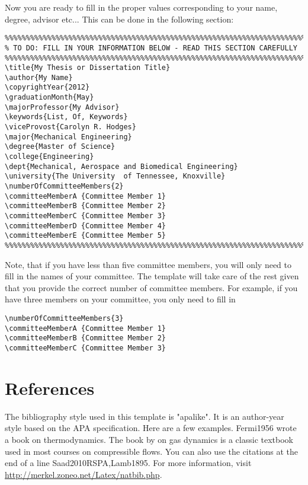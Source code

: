 Now you are ready to fill in the proper values corresponding to your name, degree, advisor etc... This can be done in the following section:
\begin{verbatim}
%%%%%%%%%%%%%%%%%%%%%%%%%%%%%%%%%%%%%%%%%%%%%%%%%%%%%%%%%%%%%%%%%%%%%%%%%%%
% TO DO: FILL IN YOUR INFORMATION BELOW - READ THIS SECTION CAREFULLY
%%%%%%%%%%%%%%%%%%%%%%%%%%%%%%%%%%%%%%%%%%%%%%%%%%%%%%%%%%%%%%%%%%%%%%%%%%%
\title{My Thesis or Dissertation Title}
\author{My Name}
\copyrightYear{2012}
\graduationMonth{May}
\majorProfessor{My Advisor}
\keywords{List, Of, Keywords}
\viceProvost{Carolyn R. Hodges}
\major{Mechanical Engineering}
\degree{Master of Science}
\college{Engineering}
\dept{Mechanical, Aerospace and Biomedical Engineering}
\university{The University  of Tennessee, Knoxville}
\numberOfCommitteeMembers{2}
\committeeMemberA {Committee Member 1}
\committeeMemberB {Committee Member 2}
\committeeMemberC {Committee Member 3}
\committeeMemberD {Committee Member 4}
\committeeMemberE {Committee Member 5}
%%%%%%%%%%%%%%%%%%%%%%%%%%%%%%%%%%%%%%%%%%%%%%%%%%%%%%%%%%%%%%%%%%%%%%%%%%%
\end{verbatim}
Note, that if you have less than five committee members, you will only need to fill in the names of your committee. The template will take care of the rest given that you provide the correct number of committee members. For example, if you have three members on your committee, you only need to fill in
\begin{verbatim}
\numberOfCommitteeMembers{3}
\committeeMemberA {Committee Member 1}
\committeeMemberB {Committee Member 2}
\committeeMemberC {Committee Member 3}
\end{verbatim}

\section{References}
The bibliography style used in this template is "apalike". It is an author-year style based on the APA specification. Here are a few examples. Fermi1956 wrote a book on thermodynamics. The book by \cite{utk:idr2016optimization} on gas dynamics is a classic textbook used in most courses on compressible flows. You can also use the citations at the end of a line Saad2010RSPA,Lamb1895. For more information, visit \href{http://merkel.zoneo.net/Latex/natbib.php}{http://merkel.zoneo.net/Latex/natbib.php}.


